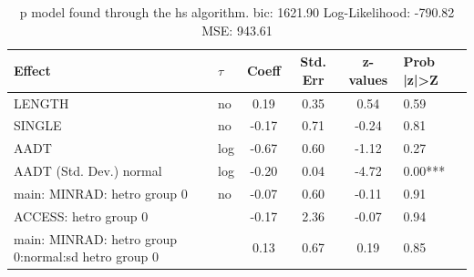 \begin{table}
	\caption{p model found through the hs algorithm. bic: 1621.90 Log-Likelihood: -790.82 MSE: 943.61}
	\begin{center}
		\begin{tabular}{|l|l|c|c|c|l|}
			\hline
			Effect & $\tau$ & Coeff & Std. Err & z-values & Prob |z|>Z \\
			\hline
			LENGTH & no & 0.19 & 0.35 & 0.54 & 0.59 \\
			\hline
			SINGLE & no & -0.17 & 0.71 & -0.24 & 0.81 \\
			\hline
			AADT & log & -0.67 & 0.60 & -1.12 & 0.27 \\
			\hline
			AADT (Std. Dev.) normal & log & -0.20 & 0.04 & -4.72 & 0.00*** \\
			\hline
			main: MINRAD: hetro group 0 & no & -0.07 & 0.60 & -0.11 & 0.91 \\
			\hline
			ACCESS: hetro group 0 &  & -0.17 & 2.36 & -0.07 & 0.94 \\
			\hline
			main: MINRAD: hetro group 0:normal:sd  hetro group 0 &  & 0.13 & 0.67 & 0.19 & 0.85 \\
			\hline
		\end{tabular}
	\end{center}
\end{table}